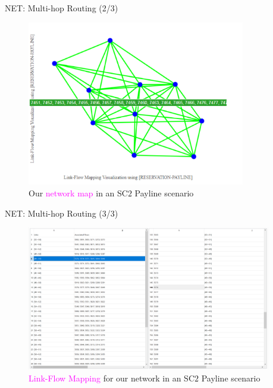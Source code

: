 \documentclass{beamer}
\begin{document}
\begin{frame}{NET: Multi-hop Routing (2/3)}
    \begin{figure}
    \centering
    \includegraphics[width = 0.85\textwidth]{Network_Graph_Payline.PNG}
    \caption{Our \textcolor{magenta}{network map} in an SC$2$ Payline scenario}
    \label{fig:19}
\end{figure}
\end{frame}
\begin{frame}{NET: Multi-hop Routing (3/3)}
\begin{figure}
    \centering
    \includegraphics[width = 0.95\textwidth]{Link_Flow_Mapping.PNG}
    \caption{\textcolor{magenta}{Link-Flow Mapping} for our network in an SC$2$ Payline scenario}
    \label{fig:18}
\end{figure}
\end{frame}
\end{document}

